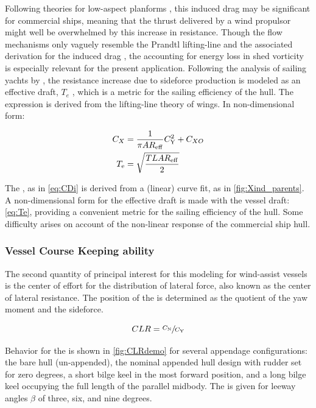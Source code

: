 \documentclass[twoside,twocolumn]{article}
\begin{document}
Following theories for low-aspect planforms \cite{Hoerner1985,Jones1946}, this induced drag may be significant for commercial ships, meaning that the thrust delivered by a wind propulsor might well be overwhelmed by this increase in resistance. Though the flow mechanisms only vaguely resemble the Prandtl lifting-line and the associated derivation for the induced drag \cite{Prandtl1918}, the accounting for energy loss in shed vorticity is especially relevant for the present application. Following the analysis of sailing yachts by \citet{Gerritsma1992}, the resistance increase due to sideforce production is modeled as an effective draft, $T_{e}$ \cite{Gerritsma1993}, which is a metric for the sailing efficiency of the hull. The expression is derived from the lifting-line theory of wings. In non-dimensional form:

\begin{subequations}
	\begin{align}
	C_{X}&=\frac{1}{\pi AR_\mathrm{eff}}C_\mathrm{Y}^2+C_{XO} 
	\label{eq:CDi}\\
	T_\mathrm{e}&=\sqrt{\dfrac{TLAR_\mathrm{eff}}{2}} 
	\label{eq:Te}
	\end{align}
\end{subequations}

\noindent
The \ARe, as in \cref{eq:CDi} is derived from a (linear) curve fit, as in \cref{fig:Xind_parents}. A non-dimensional form for the effective draft \Te is made with the vessel draft: \TeT \cref{eq:Te}, providing a convenient metric for the sailing efficiency of the hull. Some difficulty arises on account of the non-linear response of the commercial ship hull.

\subsubsection{Vessel Course Keeping ability}
The second quantity of principal interest for this modeling for wind-assist vessels is the center of effort for the distribution of lateral force, also known as the center of lateral resistance. The position of the \CLR is determined as the quotient of the yaw moment and the sideforce.

\begin{equation}
CLR=\sfrac{C_\mathrm{N}}{C_\mathrm{Y}}
\end{equation}

Behavior for the \CLR is shown in \cref{fig:CLRdemo} for several appendage configurations: the bare hull (un-appended), the nominal appended hull design with rudder set for zero degrees, a short bilge keel in the most forward position, and a long bilge keel occupying the full length of the parallel midbody. The \CLR is given for leeway angles $\beta$ of three, six, and nine degrees. 
\end{document}
